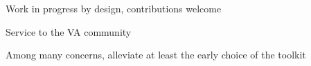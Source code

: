 Work in progress by design, contributions welcome

Service to the VA community

Among many concerns, alleviate at least the early choice of the toolkit
